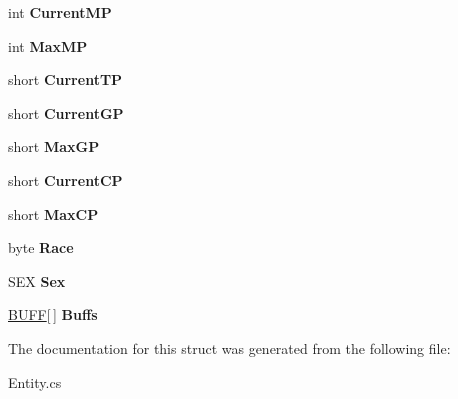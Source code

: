 \begin{DoxyCompactItemize}
\item 
\hypertarget{structffxivlib_1_1_entity_1_1_e_n_t_i_t_y_i_n_f_o_aa65fab657ee54589bb0744618111028d}{int {\bfseries Current\-M\-P}}\label{structffxivlib_1_1_entity_1_1_e_n_t_i_t_y_i_n_f_o_aa65fab657ee54589bb0744618111028d}

\item 
\hypertarget{structffxivlib_1_1_entity_1_1_e_n_t_i_t_y_i_n_f_o_ab55df5485ad2c251412921a74de18e94}{int {\bfseries Max\-M\-P}}\label{structffxivlib_1_1_entity_1_1_e_n_t_i_t_y_i_n_f_o_ab55df5485ad2c251412921a74de18e94}

\item 
\hypertarget{structffxivlib_1_1_entity_1_1_e_n_t_i_t_y_i_n_f_o_a0b078d43f885ea3e0e5561087a269f39}{short {\bfseries Current\-T\-P}}\label{structffxivlib_1_1_entity_1_1_e_n_t_i_t_y_i_n_f_o_a0b078d43f885ea3e0e5561087a269f39}

\item 
\hypertarget{structffxivlib_1_1_entity_1_1_e_n_t_i_t_y_i_n_f_o_a704400c457cb1ffc1b445642a4a5bd94}{short {\bfseries Current\-G\-P}}\label{structffxivlib_1_1_entity_1_1_e_n_t_i_t_y_i_n_f_o_a704400c457cb1ffc1b445642a4a5bd94}

\item 
\hypertarget{structffxivlib_1_1_entity_1_1_e_n_t_i_t_y_i_n_f_o_aac1da1a035793be9d863c15f14123355}{short {\bfseries Max\-G\-P}}\label{structffxivlib_1_1_entity_1_1_e_n_t_i_t_y_i_n_f_o_aac1da1a035793be9d863c15f14123355}

\item 
\hypertarget{structffxivlib_1_1_entity_1_1_e_n_t_i_t_y_i_n_f_o_af10df6e508ba32017c0fcd8ee1564e0a}{short {\bfseries Current\-C\-P}}\label{structffxivlib_1_1_entity_1_1_e_n_t_i_t_y_i_n_f_o_af10df6e508ba32017c0fcd8ee1564e0a}

\item 
\hypertarget{structffxivlib_1_1_entity_1_1_e_n_t_i_t_y_i_n_f_o_a27bd950cd1dfb8494cf69f89f5834e34}{short {\bfseries Max\-C\-P}}\label{structffxivlib_1_1_entity_1_1_e_n_t_i_t_y_i_n_f_o_a27bd950cd1dfb8494cf69f89f5834e34}

\item 
\hypertarget{structffxivlib_1_1_entity_1_1_e_n_t_i_t_y_i_n_f_o_a699875cd7898172929592fd6b407c68c}{byte {\bfseries Race}}\label{structffxivlib_1_1_entity_1_1_e_n_t_i_t_y_i_n_f_o_a699875cd7898172929592fd6b407c68c}

\item 
\hypertarget{structffxivlib_1_1_entity_1_1_e_n_t_i_t_y_i_n_f_o_a53d07d9b89bec006286483c633cfc616}{S\-E\-X {\bfseries Sex}}\label{structffxivlib_1_1_entity_1_1_e_n_t_i_t_y_i_n_f_o_a53d07d9b89bec006286483c633cfc616}

\item 
\hypertarget{structffxivlib_1_1_entity_1_1_e_n_t_i_t_y_i_n_f_o_aeb8a58b94d8da93ab2c21a658d8a1f8e}{\hyperlink{structffxivlib_1_1_b_u_f_f}{B\-U\-F\-F}\mbox{[}$\,$\mbox{]} {\bfseries Buffs}}\label{structffxivlib_1_1_entity_1_1_e_n_t_i_t_y_i_n_f_o_aeb8a58b94d8da93ab2c21a658d8a1f8e}

\end{DoxyCompactItemize}


The documentation for this struct was generated from the following file\-:\begin{DoxyCompactItemize}
\item 
Entity.\-cs\end{DoxyCompactItemize}
